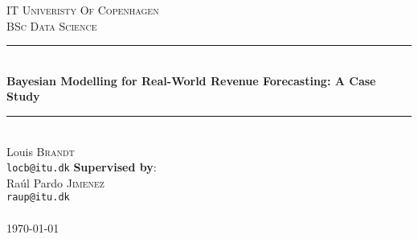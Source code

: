 \begin{titlepage} %
	\newcommand{\HRule}{\rule{\linewidth}{0.5mm}} %
	
	\center %
	
	
	\textsc{\LARGE IT Univeristy Of Copenhagen}\\[1.5cm] %
	\textsc{\Large BSc Data Science}\\[0.5cm] %
	
	
	\HRule\\[0.4cm]
	{\huge\bfseries Bayesian Modelling for Real-World Revenue Forecasting: A Case Study}\\[0.4cm] %
	\HRule\\[1.5cm]
	
	Louis \textsc{Brandt} \\
	\texttt{locb@itu.dk} 
        \vfill
        \vfill
        \vfill
        \vfill
        \textbf{Supervised by}: \\
	Ra\'ul Pardo \textsc{Jimenez} \\
	\texttt{raup@itu.dk} \\[1cm] 
	\\%
	
	\vfill %
	{\large\today} %
	
	
	\vfill %
	
\end{titlepage}
